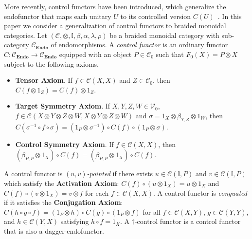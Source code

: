 More recently, control functors have been introduced, which generalize the endofunctor that maps each unitary $U$ to its controlled version $C( U )$~\cite{Delorme2026}.
In this paper we consider a generalization of control functors to braided monoidal categories.
Let $( \mathcal{C}, \otimes, \mathbb{I}, \beta, \alpha, \lambda, \rho )$ be a braided monoidal category with sub-category $\mathcal{C}_{\mathbf{Endo}}$ of endomorphisms.
A \emph{control functor} is an ordinary functor $C: \mathcal{C}_{\mathbf{Endo}} \to \mathcal{C}_{\mathbf{Endo}}$ equipped with an object $P \in \mathcal{C}_0$ such that $F_0( X ) = P \otimes X$ subject to the following axioms.
\begin{itemize}
\item \textbf{Tensor Axiom}.
      If $f \in \mathcal{C}( X, X )$ and $Z \in \mathcal{C}_0$, then $C( f \otimes 1_Z ) = C( f ) \otimes 1_Z$.
\item \textbf{Target Symmetry Axiom}.
      If $X, Y, Z, W \in \mathcal{V}_0$, $f \in \mathcal{C}( X \otimes Y \otimes Z \otimes W, X \otimes Y \otimes Z \otimes W )$ and $\sigma = 1_X \otimes \beta_{Y,Z} \otimes 1_W$, then $C( \sigma^{-1} \circ f \circ \sigma ) = ( 1_P \otimes \sigma^{-1} ) \circ C( f ) \circ ( 1_P \otimes \sigma )$.
\item \textbf{Control Symmetry Axiom}.
      If $f \in \mathcal{C}( X, X )$, then $( \beta_{P,P} \otimes 1_X ) \circ C( f ) = ( \beta_{P,P} \otimes 1_X ) \circ C( f )$.
\end{itemize}
A control functor is \emph{$( u, v )$-pointed} if there exists $u \in \mathcal{C}( \mathbb{I}, P )$ and $v \in \mathcal{C}( \mathbb{I}, P )$ which satisfy the \textbf{Activation Axiom}: $C( f ) \circ ( u \otimes 1_X ) = u \otimes 1_X$ and $C( f ) \circ ( v \otimes 1_X ) = v \otimes f$ for each $f \in \mathcal{C}( X, X )$.
A control functor is \emph{conguated} if it satisfies the \textbf{Conjugation Axiom}: $C( h \circ g \circ f ) = ( 1_P \otimes h ) \circ C( g ) \circ ( 1_P \otimes f )$ for all $f \in \mathcal{C}( X, Y )$,  $g \in \mathcal{C}( Y, Y )$, and $h \in \mathcal{C}( Y, X )$ satisfying $h \circ f = 1_X$.
A $\dagger$-control functor is a control functor that is also a dagger-endofunctor.
